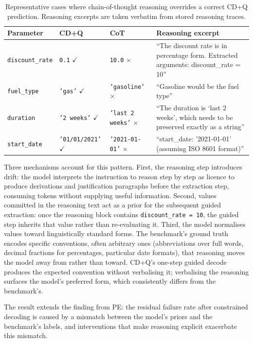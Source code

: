 \begin{table}[ht]
\centering
\caption{Representative cases where chain-of-thought reasoning overrides a
correct CD+Q prediction. Reasoning excerpts are taken verbatim from
stored reasoning traces.}
\label{tab:cot-case-studies}
\begin{tabular}{p{2.4cm} p{2.2cm} p{2.2cm} p{5.4cm}}
\toprule
Parameter & CD+Q & CoT & Reasoning excerpt \\
\midrule
\texttt{discount\_rate}
    & \texttt{0.1} $\checkmark$
    & \texttt{10.0} $\times$
    & ``The discount rate is in percentage form.
      Extracted arguments: discount\_rate = 10'' \\[4pt]
\texttt{fuel\_type}
    & \texttt{'gas'} $\checkmark$
    & \texttt{'gasoline'} $\times$
    & ``Gasoline would be the fuel type'' \\[4pt]
\texttt{duration}
    & \texttt{'2 weeks'} $\checkmark$
    & \texttt{'last 2 weeks'} $\times$
    & ``The duration is `last 2 weeks', which
      needs to be preserved exactly as a string'' \\[4pt]
\texttt{start\_date}
    & \texttt{'01/01/2021'} $\checkmark$
    & \texttt{'2021-01-01'} $\times$
    & ``start\_date: '2021-01-01'
      (assuming ISO 8601 format)'' \\
\bottomrule
\end{tabular}
\end{table}

Three mechanisms account for this pattern. First, the reasoning step introduces
drift: the model interprets the instruction to reason step by step as licence to
produce derivations and justification paragraphs before the extraction step,
consuming tokens without supplying useful information. Second, values committed
in the reasoning text act as a prior for the subsequent guided extraction: once
the reasoning block contains \texttt{discount\_rate = 10}, the guided step
inherits that value rather than re-evaluating it. Third, the model normalises
values toward linguistically standard forms. The benchmark's ground truth
encodes specific conventions, often arbitrary ones (abbreviations over full
words, decimal fractions for percentages, particular date formats), that
reasoning moves the model away from rather than toward. CD+Q's one-step
guided decode produces the expected convention without verbalising it;
verbalising the reasoning surfaces the model's preferred form, which
consistently differs from the benchmark's.

The result extends the finding from PE: the residual failure rate after
constrained decoding is caused by a mismatch between the model's priors and the
benchmark's labels, and interventions that make reasoning explicit exacerbate
this mismatch.

